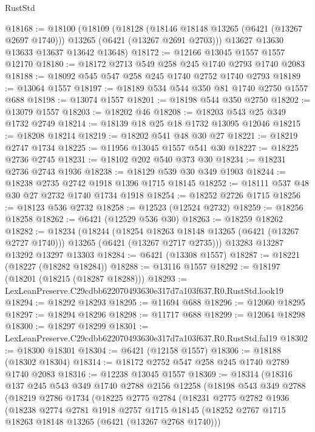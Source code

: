\begin{lexlean}{RustStd}
\begin{coremodule}
@18168 := @18100
    (@18109
      (@18128
        (@18146 @18148 @13265 (@6421 (@13267 @2697 @1740)))
        @13265
        (@6421 (@13267 @2691 @2703)))
      @13627
      @13630
      @13633
      @13637
      @13642
      @13648)
@18172 := @12166 @13045 @1557 @1557 @12170
@18180 := @18172 @2713 @549 @258 @245 @1740 @2793 @1740 @2083
@18188 := @18092 @545 @547 @258 @245 @1740 @2752 @1740 @2793
@18189 := @13064 @1557
@18197 := @18189 @534 @544 @350 @81 @1740 @2750 @1557 @688
@18198 := @13074 @1557
@18201 := @18198 @544 @350 @2750
@18202 := @13079 @1557
@18203 := @18202 @46
@18208 := @18203 @543 @25 @349 @1732 @2749
@18214 := @18139 @18 @25 @18 @1732 @13095 @12046
@18215 := @18208 @18214
@18219 := @18202 @541 @48 @30 @27
@18221 := @18219 @2747 @1734
@18225 := @11956 @13045 @1557 @541 @30
@18227 := @18225 @2736 @2745
@18231 := @18102 @202 @540 @373 @30
@18234 := @18231 @2736 @2743 @1936
@18238 := @18129 @539 @30 @349 @1903
@18244 := @18238 @2735 @2742 @1918 @1396 @1715 @18145
@18252 := @18111 @537 @48 @30 @27 @2732 @1740 @1734 @1918
@18254 := @18252 @2726 @1715
@18256 := @18123 @536 @2732
@18258 := @12523 (@12524 @2732)
@18259 := @18256 @18258
@18262 := @6421 (@12529 @536 @30)
@18263 := @18259 @18262
@18282 := @18234
    (@18244
      (@18254 @18263 @18148 @13265 (@6421 (@13267 @2727 @1740)))
      @13265
      (@6421 (@13267 @2717 @2735)))
    @13283
    @13287
    @13292
    @13297
    @13303
@18284 := @6421 (@13308 @1557)
@18287 := @18221 (@18227 (@18282 @18284))
@18288 := @13116 @1557
@18292 := @18197 (@18201 (@18215 (@18287 @18288)))
@18293 := LexLeanPreserve.C29cdbb622070493630e317d7a103f637.R0.RustStd.look19
@18294 := @18292 @18293
@18295 := @11694 @688
@18296 := @12060 @18295
@18297 := @18294 @18296
@18298 := @11717 @688
@18299 := @12064 @18298
@18300 := @18297 @18299
@18301 := LexLeanPreserve.C29cdbb622070493630e317d7a103f637.R0.RustStd.fal19
@18302 := @18300 @18301
@18304 := @6421 (@12158 @1557)
@18306 := @18188 (@18302 @18304)
@18314 := @18172 @2752 @547 @258 @245 @1740 @2789 @1740 @2083
@18316 := @12238 @13045 @1557
@18369 := @18314
    (@18316
      @137
      @245
      @543
      @349
      @1740
      @2788
      @2156
      @12258
      (@18198
        @543
        @349
        @2788
        (@18219
          @2786
          @1734
          (@18225
            @2775
            @2784
            (@18231
              @2775
              @2782
              @1936
              (@18238
                @2774
                @2781
                @1918
                @2757
                @1715
                @18145
                (@18252 @2767 @1715 @18263 @18148 @13265 (@6421 (@13267 @2768 @1740)))

\end{coremodule}
\end{lexlean}
